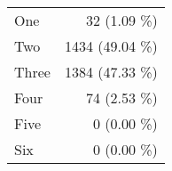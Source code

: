\begin{tabular}{ l  r }
One & 32 (1.09 \%)\\
Two & 1434 (49.04 \%)\\
Three & 1384 (47.33 \%)\\
Four & 74 (2.53 \%)\\
Five & 0 (0.00 \%)\\
Six & 0 (0.00 \%)\\
\end{tabular}